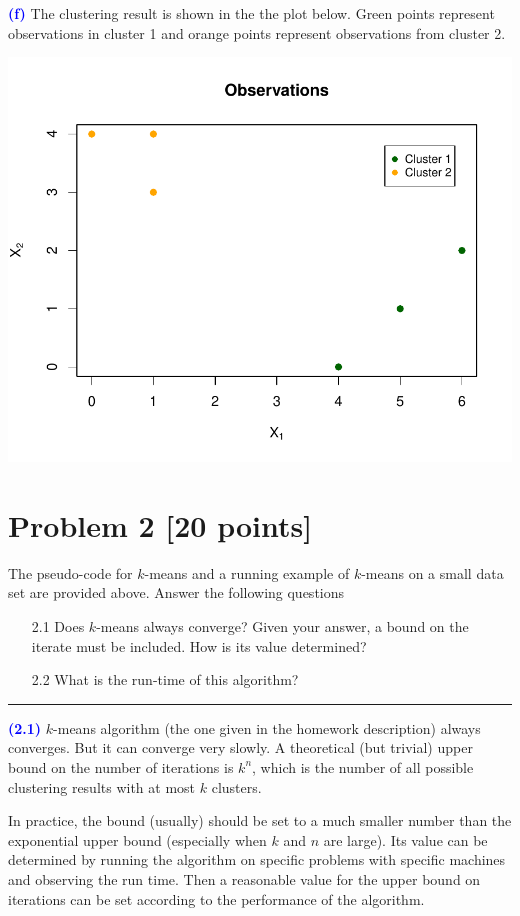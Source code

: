 \documentclass[a4paper,11pt]{article}
\newcommand{\qnum}[1]{\noindent\textcolor{blue}{\textbf{(#1)}}}
\newcommand{\sep}{\begin{center}\textcolor{gray}{\rule{\textwidth}{0.75pt}}\end{center}}
\begin{document}
\qnum{f}
The clustering result is shown in the the plot below. Green points represent observations in cluster 1 and orange points represent observations from cluster 2.
\begin{center}
  \includegraphics[width=0.75\linewidth]{Image/Prob1f.pdf}
\end{center}








\newpage
\section*{Problem 2 [20 points]} 

The pseudo-code for $k$-means and a running example of $k$-means on a small data set are provided above. Answer the following questions

\begin{enumerate}
  \item[2.1] Does $k$-means always converge? Given your answer, a bound on the iterate must be included. How is
its value determined?
  \item[2.2] What is the run-time of this algorithm?
\end{enumerate}
\sep 



\qnum{2.1}
$k$-means algorithm (the one given in the homework description) always converges. But it can converge very slowly. A theoretical (but trivial) upper bound on the number of iterations is $k^n$, which is the number of all possible clustering results with at most $k$ clusters.

In practice, the bound (usually) should be set to a much smaller number than the exponential upper bound (especially when $k$ and $n$ are large). 
Its value can be determined by running the algorithm on specific problems with specific machines and observing the run time. Then a reasonable value for the upper bound on iterations can be set according to the performance of the algorithm.
\bigskip
\end{document}
